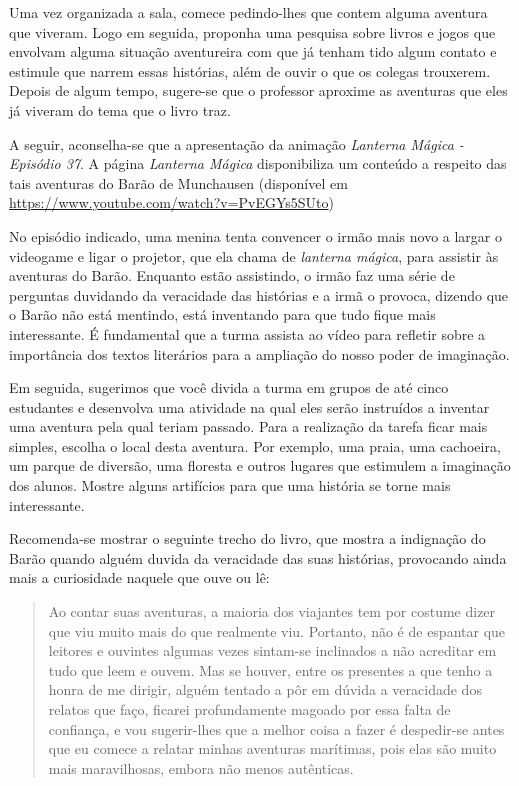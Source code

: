 \documentclass[11pt]{extarticle}
\begin{document}
Uma vez organizada a sala, comece pedindo-lhes que contem alguma aventura que viveram. Logo em seguida, proponha uma pesquisa sobre livros e jogos que envolvam alguma situação aventureira com que já tenham tido algum contato e estimule que narrem essas histórias, além de ouvir o que os colegas trouxerem. Depois de algum tempo, sugere-se que o professor aproxime as aventuras que eles já viveram do tema que o livro traz. 

A seguir, aconselha-se que a apresentação da animação \textit{Lanterna Mágica - Episódio 37}. A página \textit{Lanterna Mágica} disponibiliza um conteúdo a respeito das tais aventuras do Barão de Munchausen (disponível em \url{https://www.youtube.com/watch?v=PvEGYs5SUto})


No episódio indicado, uma menina tenta convencer o irmão mais novo a largar o videogame e ligar o projetor, que ela chama de \textit{lanterna mágica}, para assistir às aventuras do Barão. Enquanto estão assistindo, o irmão faz uma série de perguntas duvidando da veracidade das histórias e a irmã o provoca, dizendo que o Barão não está mentindo, está inventando para que tudo fique mais interessante. É fundamental que a turma assista ao vídeo para refletir sobre a importância dos textos literários para a ampliação do nosso poder de imaginação. 

Em seguida, sugerimos que você divida a turma em grupos de até cinco estudantes e desenvolva uma atividade na qual eles serão instruídos a inventar uma aventura pela qual teriam passado. Para a realização da tarefa ficar mais simples, escolha o local desta aventura. Por exemplo, uma praia, uma cachoeira, um parque de diversão, uma floresta e outros lugares que estimulem a imaginação dos alunos. Mostre alguns artifícios para que uma história se torne mais interessante. 


Recomenda-se mostrar o seguinte trecho do livro, que mostra a indignação do Barão quando alguém duvida da veracidade das suas histórias, provocando ainda mais a curiosidade naquele que ouve ou lê:

\begin{quote}

Ao contar suas aventuras, a maioria dos viajantes tem por costume dizer que viu muito mais do que realmente viu. Portanto, não é de espantar que leitores e ouvintes algumas vezes sintam-se inclinados a não acreditar em tudo que leem e ouvem. Mas se houver, entre os presentes a que tenho a honra de me dirigir, alguém tentado a pôr em dúvida a veracidade dos relatos que faço, ficarei profundamente magoado por essa falta de confiança, e vou sugerir-lhes que a melhor coisa a fazer é despedir-se antes que eu comece a relatar minhas aventuras marítimas, pois elas são muito mais maravilhosas, embora não menos autênticas.

\end{quote}
\end{document}
